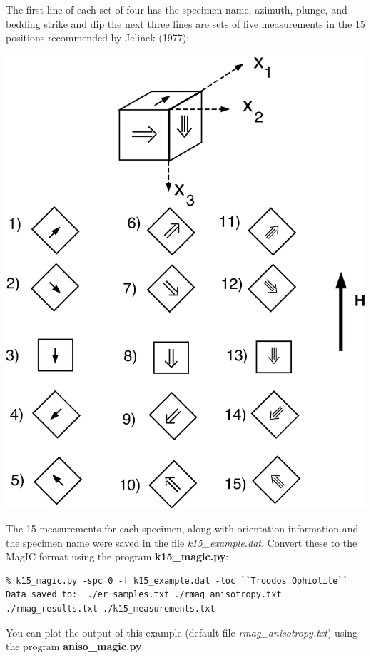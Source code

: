 \documentclass[11pt]{book}
\begin{document}
{{  The first line of each set of four has the specimen name, azimuth, plunge, and bedding strike and dip
  the next three lines are sets of five measurements in the 15 positions
 recommended by Jelinek (1977):  \nocite{jelinek77}

  \includegraphics[width=15cm]{EPSfiles/meas15.eps}


  The 15 measurements for each specimen, along with orientation information and the specimen name were saved in the file {\it k15\_example.dat}.    Convert these to the MagIC format using the program {\bf k15\_magic.py}:

\begin{verbatim}
% k15_magic.py -spc 0 -f k15_example.dat -loc ``Troodos Ophiolite``
Data saved to:  ./er_samples.txt ./rmag_anisotropy.txt ./rmag_results.txt ./k15_measurements.txt
 \end{verbatim}

You can plot the output of this example (default file {\it rmag\_anisotropy.txt}) using the program {\bf aniso\_magic.py}.

}}
\end{document}
